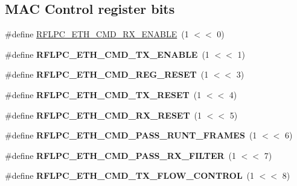 \subsection*{M\-A\-C Control register bits}
\begin{DoxyCompactItemize}
\item 
\#define \hyperlink{group__eth_ga58a4df01434a48865f35ab2e5f8abccf}{R\-F\-L\-P\-C\-\_\-\-E\-T\-H\-\_\-\-C\-M\-D\-\_\-\-R\-X\-\_\-\-E\-N\-A\-B\-L\-E}~(1 $<$$<$ 0)
\item 
\hypertarget{group__eth_ga8f98ad89d7f5e46842f3998b96c206dc}{\#define {\bfseries R\-F\-L\-P\-C\-\_\-\-E\-T\-H\-\_\-\-C\-M\-D\-\_\-\-T\-X\-\_\-\-E\-N\-A\-B\-L\-E}~(1 $<$$<$ 1)}\label{group__eth_ga8f98ad89d7f5e46842f3998b96c206dc}

\item 
\hypertarget{group__eth_ga27de294aadc04922784750544ff3ecb4}{\#define {\bfseries R\-F\-L\-P\-C\-\_\-\-E\-T\-H\-\_\-\-C\-M\-D\-\_\-\-R\-E\-G\-\_\-\-R\-E\-S\-E\-T}~(1 $<$$<$ 3)}\label{group__eth_ga27de294aadc04922784750544ff3ecb4}

\item 
\hypertarget{group__eth_ga50aed245aead6f456619e29f1c307e84}{\#define {\bfseries R\-F\-L\-P\-C\-\_\-\-E\-T\-H\-\_\-\-C\-M\-D\-\_\-\-T\-X\-\_\-\-R\-E\-S\-E\-T}~(1 $<$$<$ 4)}\label{group__eth_ga50aed245aead6f456619e29f1c307e84}

\item 
\hypertarget{group__eth_ga9373a2b4d9c9d577fa8cb25091dd5033}{\#define {\bfseries R\-F\-L\-P\-C\-\_\-\-E\-T\-H\-\_\-\-C\-M\-D\-\_\-\-R\-X\-\_\-\-R\-E\-S\-E\-T}~(1 $<$$<$ 5)}\label{group__eth_ga9373a2b4d9c9d577fa8cb25091dd5033}

\item 
\hypertarget{group__eth_ga35204d5d3f7cad0db42315add68e9ee0}{\#define {\bfseries R\-F\-L\-P\-C\-\_\-\-E\-T\-H\-\_\-\-C\-M\-D\-\_\-\-P\-A\-S\-S\-\_\-\-R\-U\-N\-T\-\_\-\-F\-R\-A\-M\-E\-S}~(1 $<$$<$ 6)}\label{group__eth_ga35204d5d3f7cad0db42315add68e9ee0}

\item 
\hypertarget{group__eth_gafc2e4271b17b5f9c66431a30e758efe1}{\#define {\bfseries R\-F\-L\-P\-C\-\_\-\-E\-T\-H\-\_\-\-C\-M\-D\-\_\-\-P\-A\-S\-S\-\_\-\-R\-X\-\_\-\-F\-I\-L\-T\-E\-R}~(1 $<$$<$ 7)}\label{group__eth_gafc2e4271b17b5f9c66431a30e758efe1}

\item 
\hypertarget{group__eth_gae3900496e6bf4401e6c6d8fb83bd9744}{\#define {\bfseries R\-F\-L\-P\-C\-\_\-\-E\-T\-H\-\_\-\-C\-M\-D\-\_\-\-T\-X\-\_\-\-F\-L\-O\-W\-\_\-\-C\-O\-N\-T\-R\-O\-L}~(1 $<$$<$ 8)}\label{group__eth_gae3900496e6bf4401e6c6d8fb83bd9744}


\end{DoxyCompactItemize}
